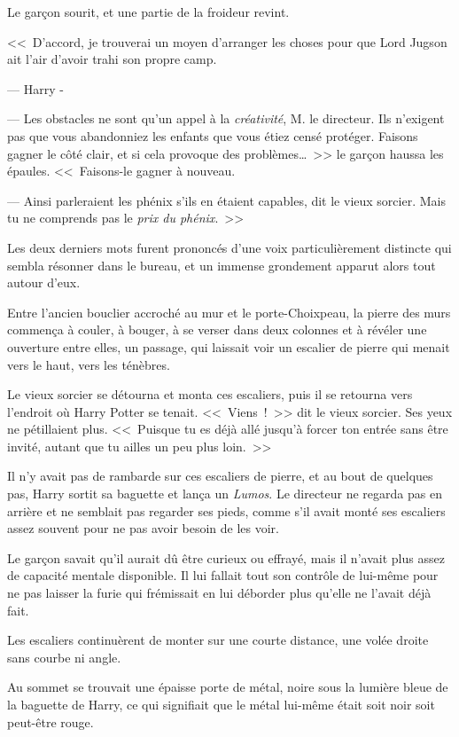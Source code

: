 Le garçon sourit, et une partie de la froideur revint.

<<~D'accord, je trouverai un moyen d'arranger les choses pour que Lord Jugson ait l'air d'avoir trahi son propre camp.

--- Harry -

--- Les obstacles ne sont qu'un appel à la \emph{créativité}, M. le directeur. Ils n'exigent pas que vous abandonniez les enfants que vous étiez censé protéger. Faisons gagner le côté clair, et si cela provoque des problèmes…~>> le garçon haussa les épaules. <<~Faisons-le gagner à nouveau.

--- Ainsi parleraient les phénix s'ils en étaient capables, dit le vieux sorcier. Mais tu ne comprends pas le \emph{prix du phénix}.~>>

Les deux derniers mots furent prononcés d'une voix particulièrement distincte qui sembla résonner dans le bureau, et un immense grondement apparut alors tout autour d'eux.

Entre l'ancien bouclier accroché au mur et le porte-Choixpeau, la pierre des murs commença à couler, à bouger, à se verser dans deux colonnes et à révéler une ouverture entre elles, un passage, qui laissait voir un escalier de pierre qui menait vers le haut, vers les ténèbres.

Le vieux sorcier se détourna et monta ces escaliers, puis il se retourna vers l'endroit où Harry Potter se tenait. <<~Viens~!~>> dit le vieux sorcier. Ses yeux ne pétillaient plus. <<~Puisque tu es déjà allé jusqu'à forcer ton entrée sans être invité, autant que tu ailles un peu plus loin.~>>

\later

Il n'y avait pas de rambarde sur ces escaliers de pierre, et au bout de quelques pas, Harry sortit sa baguette et lança un \emph{Lumos}. Le directeur ne regarda pas en arrière et ne semblait pas regarder ses pieds, comme s'il avait monté ses escaliers assez souvent pour ne pas avoir besoin de les voir.

Le garçon savait qu'il aurait dû être curieux ou effrayé, mais il n'avait plus assez de capacité mentale disponible. Il lui fallait tout son contrôle de lui-même pour ne pas laisser la furie qui frémissait en lui déborder plus qu'elle ne l'avait déjà fait.

Les escaliers continuèrent de monter sur une courte distance, une volée droite sans courbe ni angle.

Au sommet se trouvait une épaisse porte de métal, noire sous la lumière bleue de la baguette de Harry, ce qui signifiait que le métal lui-même était soit noir soit peut-être rouge.

